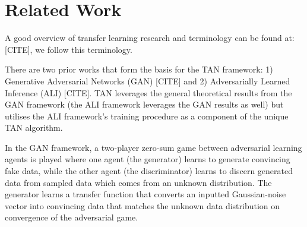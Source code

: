\documentclass{article}
\begin{document}



\section{Related Work}

A good overview of transfer learning research and terminology can be found at: [CITE], we follow this terminology.

There are two prior works that form the basis for the TAN framework: 1) Generative Adversarial Networks (GAN) [CITE] and 2) Adversarially Learned Inference (ALI) [CITE]. TAN leverages the general theoretical results from the GAN framework (the ALI framework leverages the GAN results as well) but utilises the ALI framework's training procedure as a component of the unique TAN algorithm.

In the GAN framework, a two-player zero-sum game between adversarial learning agents is played where one agent (the generator) learns to generate convincing fake data, while the other agent (the discriminator) learns to discern generated data from sampled data which comes from an unknown distribution. The generator learns a transfer function that converts an inputted Gaussian-noise vector into convincing data that matches the unknown data distribution on convergence of the adversarial game.
\end{document}
